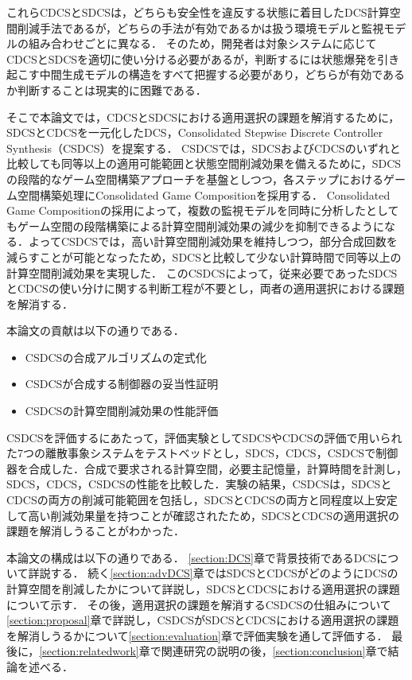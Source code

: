 これらCDCSとSDCSは，どちらも安全性を違反する状態に着目したDCS計算空間削減手法であるが，どちらの手法が有効であるかは扱う環境モデルと監視モデルの組み合わせごとに異なる．
そのため，開発者は対象システムに応じてCDCSとSDCSを適切に使い分ける必要があるが，判断するには状態爆発を引き起こす中間生成モデルの構造をすべて把握する必要があり，どちらが有効であるか判断することは現実的に困難である．

そこで本論文では，CDCSとSDCSにおける適用選択の課題を解消するために，SDCSとCDCSを一元化したDCS，Consolidated Stepwise Discrete Controller Synthesis（CSDCS）を提案する．
CSDCSでは，SDCSおよびCDCSのいずれと比較しても同等以上の適用可能範囲と状態空間削減効果を備えるために，SDCSの段階的なゲーム空間構築アプローチを基盤としつつ，各ステップにおけるゲーム空間構築処理にConsolidated Game Compositionを採用する．
Consolidated Game Compositionの採用によって，複数の監視モデルを同時に分析したとしてもゲーム空間の段階構築による計算空間削減効果の減少を抑制できるようになる．よってCSDCSでは，高い計算空間削減効果を維持しつつ，部分合成回数を減らすことが可能となったため，SDCSと比較して少ない計算時間で同等以上の計算空間削減効果を実現した．
このCSDCSによって，従来必要であったSDCSとCDCSの使い分けに関する判断工程が不要とし，両者の適用選択における課題を解消する．

本論文の貢献は以下の通りである．
\begin{itemize}
	\item CSDCSの合成アルゴリズムの定式化
	\item CSDCSが合成する制御器の妥当性証明
	\item CSDCSの計算空間削減効果の性能評価
\end{itemize}
CSDCSを評価するにあたって，評価実験としてSDCSやCDCSの評価で用いられた7つの離散事象システムをテストベッドとし，SDCS，CDCS，CSDCSで制御器を合成した．合成で要求される計算空間，必要主記憶量，計算時間を計測し，SDCS，CDCS，CSDCSの性能を比較した．実験の結果，CSDCSは，SDCSとCDCSの両方の削減可能範囲を包括し，SDCSとCDCSの両方と同程度以上安定して高い削減効果量を持つことが確認されたため，SDCSとCDCSの適用選択の課題を解消しうることがわかった．

本論文の構成は以下の通りである．
\ref{section:DCS}章で背景技術であるDCSについて詳説する．
続く\ref{section:advDCS}章ではSDCSとCDCSがどのようにDCSの計算空間を削減したかについて詳説し，SDCSとCDCSにおける適用選択の課題について示す．
その後，適用選択の課題を解消するCSDCSの仕組みについて\ref{section:proposal}章で詳説し，CSDCSがSDCSとCDCSにおける適用選択の課題を解消しうるかについて\ref{section:evaluation}章で評価実験を通して評価する．
最後に，\ref{section:relatedwork}章で関連研究の説明の後，\ref{section:conclusion}章で結論を述べる．
